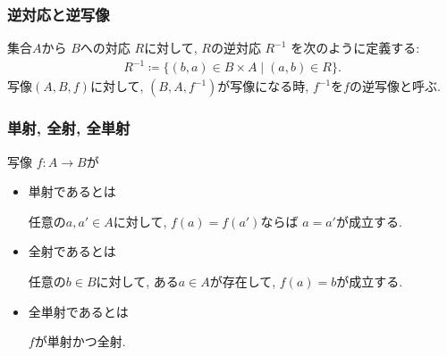 \documentclass[unicode,12pt]{beamer}%
\begin{document}
\begin{frame}
  \frametitle{逆対応と逆写像}
 集合$A$から $B$への対応 $R$に対して, $R$の逆対応 $R^{-1}$ を次のように定義する: 
 \begin{equation}
   \begin{aligned}
     R^{-1}\coloneqq \{(b,a) \in B \times A  \mid (a,b) \in R\} .
   \end{aligned}
 \end{equation} 
写像$(A,B,f)$に対して,  $(B,A,f^{-1})$が写像になる時, $f^{-1}$を$f$の逆写像と呼ぶ.
\end{frame}

\begin{frame}
  \frametitle{単射, 全射, 全単射}

 写像 $f:A \to B$が
\begin{itemize}
  \item 
  単射であるとは
  
  任意の$a, a' \in A$に対して, $f(a) = f(a')$ならば $a = a'$が成立する. 

\item 全射であるとは

  任意の$b \in B$に対して, ある$a \in A$が存在して, $f(a) = b$が成立する. 

\item 全単射であるとは

   $f$が単射かつ全射.
\end{itemize}

  
\end{frame}
\end{document}
